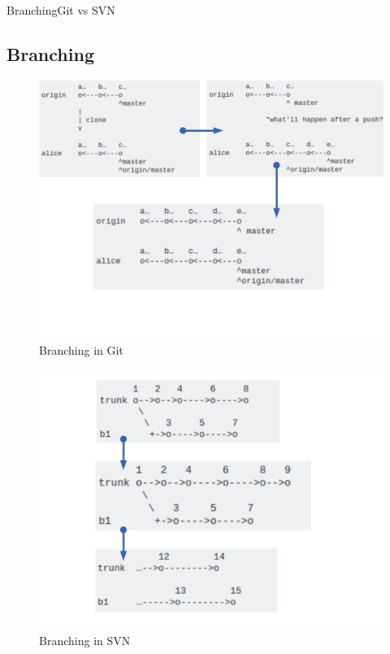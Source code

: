 \documentclass{beamer}
\begin{document}
\begin{frame}[allowframebreaks]{Branching}{Git vs SVN}
\subsection{Branching}
\begin{figure}
	\includegraphics[scale=0.3]{images/git_vs_svn}
	\caption{Branching in Git\cite{branching}}
\end{figure}

\begin{figure}
	\includegraphics[scale=0.34]{images/svn.jpg}
	\caption{Branching in SVN\cite{branching}}
\end{figure}

\end{frame}
\end{document}
